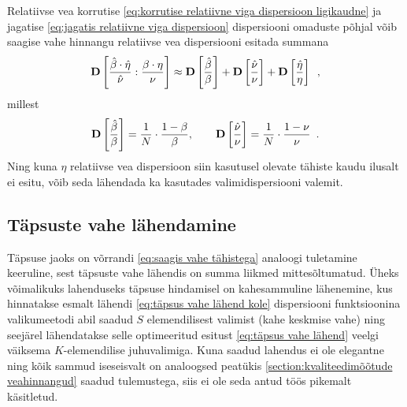Relatiivse vea korrutise \eqref{eq:korrutise relatiivne viga dispersioon ligikaudne} ja jagatise \eqref{eq:jagatis relatiivne viga dispersioon} dispersiooni omaduste põhjal võib saagise vahe hinnangu relatiivse vea dispersiooni esitada summana
\begin{equation*}
    \operatorname*{\mathbf{D}}\left[\frac{\hat{\beta}\cdot\hat{\eta}}{\hat{\nu}}:\frac{\beta\cdot\eta}{\nu}\right]\approx\operatorname*{\mathbf{D}}\left[\frac{\hat{\beta}}{\beta}\right]+\operatorname*{\mathbf{D}}\left[\frac{\hat{\nu}}{\nu}\right]+\operatorname*{\mathbf{D}}\left[\frac{\hat{\eta}}{\eta}\right] \enspace,
\end{equation*}
millest
\begin{equation*}
    \operatorname*{\mathbf{D}}\left[\frac{\hat{\beta}}{\beta}\right]=\frac{1}{N}\cdot\frac{1-\beta}{\beta},\qquad \operatorname*{\mathbf{D}}\left[\frac{\hat{\nu}}{\nu}\right]=\frac{1}{N}\cdot\frac{1-\nu}{\nu} \enspace. \\
\end{equation*}
Ning kuna $\eta$ relatiivse vea dispersioon siin kasutusel olevate tähiste kaudu ilusalt ei esitu, võib seda lähendada ka kasutades valimidispersiooni valemit.

\subsection{Täpsuste vahe lähendamine}
Täpsuse jaoks on võrrandi \eqref{eq:saagis vahe tähistega} analoogi tuletamine keeruline, sest täpsuste vahe lähendis on summa liikmed mittesõltumatud. Üheks võimalikuks lahenduseks täpsuse hindamisel on kahesammuline lähenemine, kus hinnatakse esmalt lähendi \eqref{eq:täpsus vahe lähend kole} dispersiooni funktsioonina valikumeetodi abil saadud $S$ elemendilisest valimist (kahe keskmise vahe) ning seejärel lähendatakse selle optimeeritud esitust \eqref{eq:täpsus vahe lähend} veelgi väiksema $K$-elemendilise juhuvalimiga. Kuna saadud lahendus ei ole elegantne ning kõik sammud iseseisvalt on analoogsed peatükis \ref{section:kvaliteedimõõtude veahinnangud} saadud tulemustega, siis ei ole seda antud töös pikemalt käsitletud.